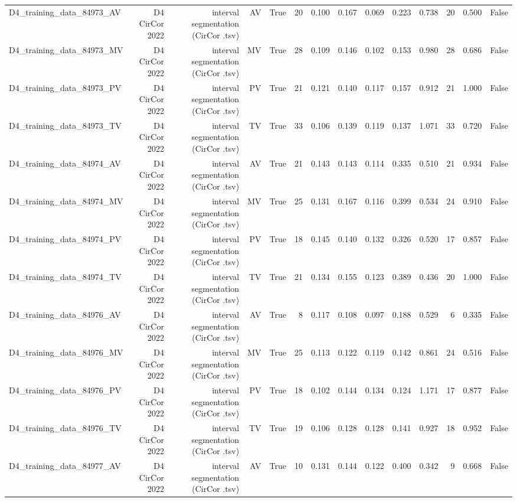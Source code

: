 \begin{table}[htbp]
\begin{tabular}{lrrrrrrrrrrrrr}
    D4\_training\_data\_84973\_AV & D4 CirCor 2022 & interval segmentation (CirCor .tsv) & AV & True & 20 & 0.100 & 0.167 & 0.069 & 0.223 & 0.738 & 20 & 0.500 & False \\
    D4\_training\_data\_84973\_MV & D4 CirCor 2022 & interval segmentation (CirCor .tsv) & MV & True & 28 & 0.109 & 0.146 & 0.102 & 0.153 & 0.980 & 28 & 0.686 & False \\
    D4\_training\_data\_84973\_PV & D4 CirCor 2022 & interval segmentation (CirCor .tsv) & PV & True & 21 & 0.121 & 0.140 & 0.117 & 0.157 & 0.912 & 21 & 1.000 & False \\
    D4\_training\_data\_84973\_TV & D4 CirCor 2022 & interval segmentation (CirCor .tsv) & TV & True & 33 & 0.106 & 0.139 & 0.119 & 0.137 & 1.071 & 33 & 0.720 & False \\
    D4\_training\_data\_84974\_AV & D4 CirCor 2022 & interval segmentation (CirCor .tsv) & AV & True & 21 & 0.143 & 0.143 & 0.114 & 0.335 & 0.510 & 21 & 0.934 & False \\
    D4\_training\_data\_84974\_MV & D4 CirCor 2022 & interval segmentation (CirCor .tsv) & MV & True & 25 & 0.131 & 0.167 & 0.116 & 0.399 & 0.534 & 24 & 0.910 & False \\
    D4\_training\_data\_84974\_PV & D4 CirCor 2022 & interval segmentation (CirCor .tsv) & PV & True & 18 & 0.145 & 0.140 & 0.132 & 0.326 & 0.520 & 17 & 0.857 & False \\
    D4\_training\_data\_84974\_TV & D4 CirCor 2022 & interval segmentation (CirCor .tsv) & TV & True & 21 & 0.134 & 0.155 & 0.123 & 0.389 & 0.436 & 20 & 1.000 & False \\
    D4\_training\_data\_84976\_AV & D4 CirCor 2022 & interval segmentation (CirCor .tsv) & AV & True & 8 & 0.117 & 0.108 & 0.097 & 0.188 & 0.529 & 6 & 0.335 & False \\
    D4\_training\_data\_84976\_MV & D4 CirCor 2022 & interval segmentation (CirCor .tsv) & MV & True & 25 & 0.113 & 0.122 & 0.119 & 0.142 & 0.861 & 24 & 0.516 & False \\
    D4\_training\_data\_84976\_PV & D4 CirCor 2022 & interval segmentation (CirCor .tsv) & PV & True & 18 & 0.102 & 0.144 & 0.134 & 0.124 & 1.171 & 17 & 0.877 & False \\
    D4\_training\_data\_84976\_TV & D4 CirCor 2022 & interval segmentation (CirCor .tsv) & TV & True & 19 & 0.106 & 0.128 & 0.128 & 0.141 & 0.927 & 18 & 0.952 & False \\
    D4\_training\_data\_84977\_AV & D4 CirCor 2022 & interval segmentation (CirCor .tsv) & AV & True & 10 & 0.131 & 0.144 & 0.122 & 0.400 & 0.342 & 9 & 0.668 & False \\

\end{tabular}
\end{table}
